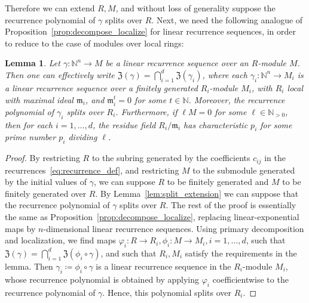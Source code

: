 \documentclass[letterpaper, 11pt, thm-restate]{article}
\numberwithin{equation}{section}
\newcommand{\N}{\mathbb{N}}
\newcommand{\mZ}{\mathfrak{Z}}
\newcommand{\be}{\boldsymbol{e}}
\newcommand{\bj}{\boldsymbol{j}}
\newcommand{\bn}{\boldsymbol{n}}
\newcommand{\frm}{\mathfrak{m}}
\newtheorem{lemma}[theorem]{Lemma}
\theoremstyle{definition}
\theoremstyle{definition}
\theoremstyle{definition}
\begin{document}
Therefore we can extend $R,M$, and without loss of generality suppose the recurrence polynomial of $\gamma$ splits over $R$.
Next, we need the following analogue of Proposition~\ref{prop:decompose_localize} for linear recurrence sequences, in order to reduce to the case of modules over local rings:
\begin{lemma}\label{lem:decompose_LRS}
    Let $\gamma \colon \N^n\rightarrow M$ be a linear recurrence sequence over an $R$-module $M$.
    Then one can effectively write $\mZ(\gamma) = \bigcap_{i = 1}^d \mZ(\gamma_i)$, where each $\gamma_i:\N^n\rightarrow M_i$ is a linear recurrence sequence over a finitely generated $R_i$-module $M_i$, with $R_i$ local with maximal ideal $\frm_i$, and $\frm_i^t = 0$ for some $t \in \N$.
    Moreover, the recurrence polynomial of $\gamma_i$ splits over $R_i$.
    Furthermore, if $\ell M = 0$ for some $\ell \in \N_{>0}$, then for each $i = 1, \ldots, d$, the residue field $R_i/\frm_i$ has characteristic $p_i$ for some prime number $p_i$ dividing $\ell$.
\end{lemma}
\begin{proof}
    By restricting $R$ to the subring generated by the coefficients $c_{ij}$ in the recurrences~\eqref{eq:recurrence_def}, and restricting $M$ to the submodule generated by the initial values of $\gamma$, we can suppose $R$ to be finitely generated and $M$ to be finitely generated over $R$.
    By Lemma~\ref{lem:split_extension} we can suppose that the recurrence polynomial of $\gamma$ splits over $R$.
    The rest of the proof is essentially the same as Proposition~\ref{prop:decompose_localize}, replacing linear-exponential maps by $n$-dimensional linear recurrence sequences.
    Using primary decomposition and localization, we find maps $\varphi_i \colon R \rightarrow R_i, \phi_i \colon M \rightarrow M_i, i = 1, \ldots, d$, such that $\mZ(\gamma) = \bigcap_{i = 1}^d \mZ(\phi_i \circ \gamma)$, and such that $R_i, M_i$ satisfy the requirements in the lemma.
    Then $\gamma_i \coloneqq \phi_i \circ \gamma$ is a linear recurrence sequence in the $R_i$-module $M_i$, whose recurrence polynomial is obtained by applying $\varphi_i$ coefficientwise to the recurrence polynomial of $\gamma$.
    Hence, this polynomial splits over $R_i$.
\end{proof}
\end{document}
